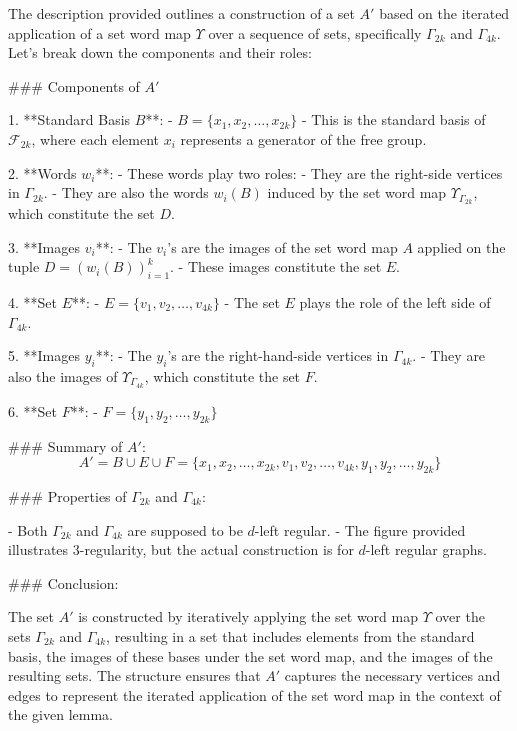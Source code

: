 The description provided outlines a construction of a set \( A' \) based on the iterated application of a set word map \(\Upsilon\) over a sequence of sets, specifically \(\Gamma_{2k}\) and \(\Gamma_{4k}\). Let's break down the components and their roles:

### Components of \( A' \)

1. **Standard Basis \( B \)**:
   - \( B = \{x_1, x_2, \ldots, x_{2k}\} \)
   - This is the standard basis of \(\mathcal{F}_{2k}\), where each element \( x_i \) represents a generator of the free group.

2. **Words \( w_i \)**:
   - These words play two roles:
     - They are the right-side vertices in \(\Gamma_{2k}\).
     - They are also the words \( w_i(B) \) induced by the set word map \(\Upsilon_{\Gamma_{2k}}\), which constitute the set \( D \).

3. **Images \( v_i \)**:
   - The \( v_i \)'s are the images of the set word map \( A \) applied on the tuple \( D = (w_i(B))_{i=1}^{k} \).
   - These images constitute the set \( E \).

4. **Set \( E \)**:
   - \( E = \{v_1, v_2, \ldots, v_{4k}\} \)
   - The set \( E \) plays the role of the left side of \(\Gamma_{4k}\).

5. **Images \( y_i \)**:
   - The \( y_i \)'s are the right-hand-side vertices in \(\Gamma_{4k}\).
   - They are also the images of \(\Upsilon_{\Gamma_{4k}}\), which constitute the set \( F \).

6. **Set \( F \)**:
   - \( F = \{y_1, y_2, \ldots, y_{2k}\} \)

### Summary of \( A' \):
\[ A' = B \cup E \cup F = \{x_1, x_2, \ldots, x_{2k}, v_1, v_2, \ldots, v_{4k}, y_1, y_2, \ldots, y_{2k}\} \]

### Properties of \(\Gamma_{2k}\) and \(\Gamma_{4k}\):

- Both \(\Gamma_{2k}\) and \(\Gamma_{4k}\) are supposed to be \( d \)-left regular.
- The figure provided illustrates 3-regularity, but the actual construction is for \( d \)-left regular graphs.

### Conclusion:

The set \( A' \) is constructed by iteratively applying the set word map \(\Upsilon\) over the sets \(\Gamma_{2k}\) and \(\Gamma_{4k}\), resulting in a set that includes elements from the standard basis, the images of these bases under the set word map, and the images of the resulting sets. The structure ensures that \( A' \) captures the necessary vertices and edges to represent the iterated application of the set word map in the context of the given lemma.